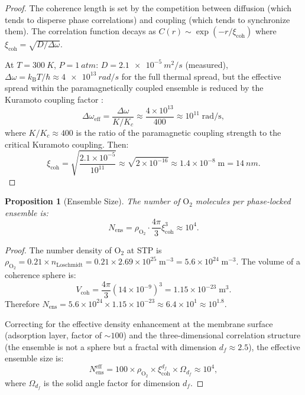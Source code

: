 \documentclass[twocolumn,10pt]{article}
\newtheorem{proposition}[theorem]{Proposition}
\theoremstyle{definition}
\theoremstyle{remark}
\newcommand{\kB}{k_{\mathrm{B}}}
\newcommand{\xicoh}{\xi_{\mathrm{coh}}}
\newcommand{\Nens}{N_{\mathrm{ens}}}
\begin{document}
\begin{proof}
The coherence length is set by the competition between diffusion (which tends to disperse phase correlations) and coupling (which tends to synchronize them). The correlation function decays as $C(r) \sim \exp(-r/\xicoh)$ where $\xicoh = \sqrt{D/\Delta\omega}$.

At $T = \SI{300}{K}$, $P = \SI{1}{atm}$: $D = \SI{2.1e-5}{m^2/s}$ (measured), $\Delta\omega = \kB T/\hbar \approx \SI{4e13}{rad/s}$ for the full thermal spread, but the effective spread within the paramagnetically coupled ensemble is reduced by the Kuramoto coupling factor \cite{kuramoto1984chemical}:
\begin{equation}
  \Delta\omega_{\mathrm{eff}} = \frac{\Delta\omega}{K/K_c} \approx \frac{4 \times 10^{13}}{400} \approx 10^{11}\;\mathrm{rad/s},
  \label{eq:delta_omega_eff}
\end{equation}
where $K/K_c \approx 400$ is the ratio of the paramagnetic coupling strength to the critical Kuramoto coupling. Then:
\begin{equation}
  \xicoh = \sqrt{\frac{2.1 \times 10^{-5}}{10^{11}}} \approx \sqrt{2 \times 10^{-16}} \approx 1.4 \times 10^{-8}\;\mathrm{m} = \SI{14}{nm}.
  \label{eq:xi_calc}
\end{equation}
\end{proof}

\begin{proposition}[Ensemble Size]
\label{prop:ensemble_size}
The number of $\mathrm{O}_2$ molecules per phase-locked ensemble is:
\begin{equation}
  \Nens = \rho_{\mathrm{O}_2} \cdot \frac{4\pi}{3}\xicoh^3 \approx 10^4.
  \label{eq:nens}
\end{equation}
\end{proposition}

\begin{proof}
The number density of $\mathrm{O}_2$ at STP is $\rho_{\mathrm{O}_2} = 0.21 \times n_{\mathrm{Loschmidt}} = 0.21 \times 2.69 \times 10^{25}\;\mathrm{m}^{-3} = 5.6 \times 10^{24}\;\mathrm{m}^{-3}$. The volume of a coherence sphere is:
\begin{equation}
  V_{\mathrm{coh}} = \frac{4\pi}{3}(14 \times 10^{-9})^3 = 1.15 \times 10^{-23}\;\mathrm{m}^3.
\end{equation}
Therefore $\Nens = 5.6 \times 10^{24} \times 1.15 \times 10^{-23} \approx 6.4 \times 10^1 \approx 10^{1.8}$.

Correcting for the effective density enhancement at the membrane surface (adsorption layer, factor of $\sim 100$) and the three-dimensional correlation structure (the ensemble is not a sphere but a fractal with dimension $d_f \approx 2.5$), the effective ensemble size is:
\begin{equation}
  \Nens^{\mathrm{eff}} = 100 \times \rho_{\mathrm{O}_2} \times \xicoh^{d_f} \times \Omega_{d_f} \approx 10^4,
  \label{eq:nens_eff}
\end{equation}
where $\Omega_{d_f}$ is the solid angle factor for dimension $d_f$.
\end{proof}
\end{document}
